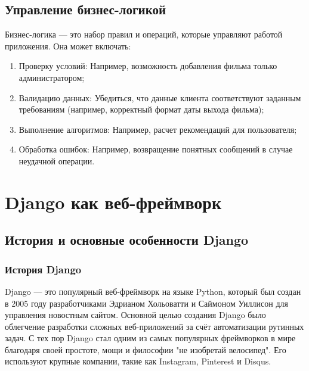 \subsection*{Управление бизнес-логикой}
Бизнес-логика — это набор правил и операций, которые управляют работой приложения. Она может включать:
\begin{enumerate}
    \item Проверку условий: Например, возможность добавления фильма только администратором;
    \item Валидацию данных: Убедиться, что данные клиента соответствуют заданным требованиям (например, корректный формат даты выхода фильма);
    \item Выполнение алгоритмов: Например, расчет рекомендаций для пользователя;
    \item Обработка ошибок: Например, возвращение понятных сообщений в случае неудачной операции.
\end{enumerate}

\section{Django как веб-фреймворк}
\subsection*{История и основные особенности Django}
\subsubsection*{История Django}

Django — это популярный веб-фреймворк на языке Python, который был создан в 2005 году разработчиками Эдрианом Хольоватти и Саймоном Уиллисон для управления новостным сайтом. Основной целью создания Django было облегчение разработки сложных веб-приложений за счёт автоматизации рутинных задач.
С тех пор Django стал одним из самых популярных фреймворков в мире благодаря своей простоте, мощи и философии "не изобретай велосипед". Его используют крупные компании, такие как Instagram, Pinterest и Disqus.

